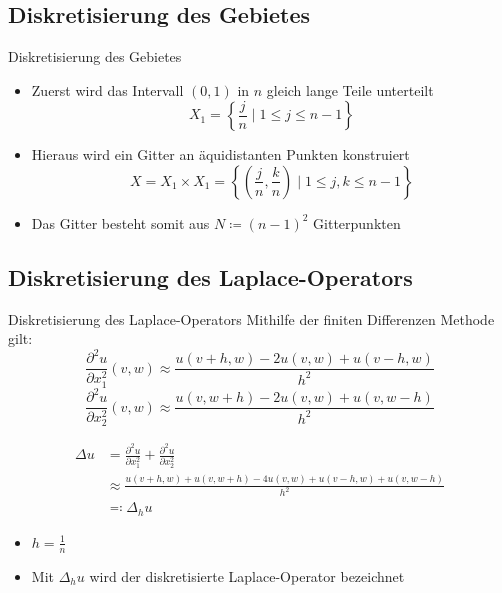 \documentclass[9pt, t]{beamer}
\begin{document}
\subsection{Diskretisierung des Gebietes}
\begin{frame}{Diskretisierung des Gebietes}
\begin{itemize}
    \item 
    Zuerst wird das Intervall \((0,1)\) in \(n\) gleich lange Teile unterteilt
    \[
     X_1 = \left\{ \frac{j}{n} \mid 1 \leq j \leq n-1 \right\}
    \]
    \item 
    Hieraus wird ein Gitter an äquidistanten Punkten konstruiert
    \[
        X = X_1 \times X_1 = \left\{ \left( \frac{j}{n}, \frac{k}{n} \right) \mid 1 \leq j, k \leq n-1 \right\}
    \]
    \item 
    Das Gitter besteht somit aus \(N \coloneq(n - 1)^2\) Gitterpunkten
\end{itemize}
\end{frame}


\subsection{Diskretisierung des Laplace-Operators}
\begin{frame}{Diskretisierung des Laplace-Operators}
Mithilfe der finiten Differenzen Methode gilt:
\[
    \frac{\partial^2 u}{\partial x_1^2} (v, w) \approx \frac{u(v + h, w) - 2u(v, w) + u(v - h, w)}{h^2}
\]
\[
    \frac{\partial^2 u}{\partial x_2^2} (v, w) \approx \frac{u(v, w + h) - 2u(v, w) + u(v, w - h)}{h^2}
\]

\begin{align*}
    \Delta u & = \frac{\partial^2 u}{\partial x_1^2} + \frac{\partial^2 u}{\partial x_2^2}           \\
             & \approx \frac{u(v + h, w) + u(v, w + h) - 4u(v, w) + u(v - h, w) + u(v, w - h)}{h^2}
    \\
             & \eqcolon \Delta_h u
\end{align*}
\begin{itemize}
    \item \(h = \frac{1}{n}\)
    \item Mit \(\Delta_h u\) wird der diskretisierte Laplace-Operator bezeichnet
\end{itemize}
\end{frame}
\end{document}
